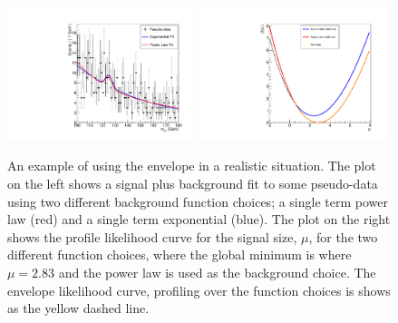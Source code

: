 \begin{figure}
  \begin{center}
    \includegraphics[width=0.49\textwidth]{ch5_anal_and_results/plots/envelope_explain2.pdf}
    \includegraphics[width=0.49\textwidth]{ch5_anal_and_results/plots/envelope_explain3.pdf}
    \caption{An example of using the envelope in a realistic situation. The plot on the left shows a signal plus background fit to some pseudo-data using two different background function choices; a single term power law (red) and a single term exponential (blue). The plot on the right shows the profile likelihood curve for the signal size, $\mu$, for the two different function choices, where the global minimum is where $\mu=2.83$ and the power law is used as the background choice. The envelope likelihood curve, profiling over the function choices is shows as the yellow dashed line.}
    \label{fig:envelope_explain2}
  \end{center}
\end{figure}

